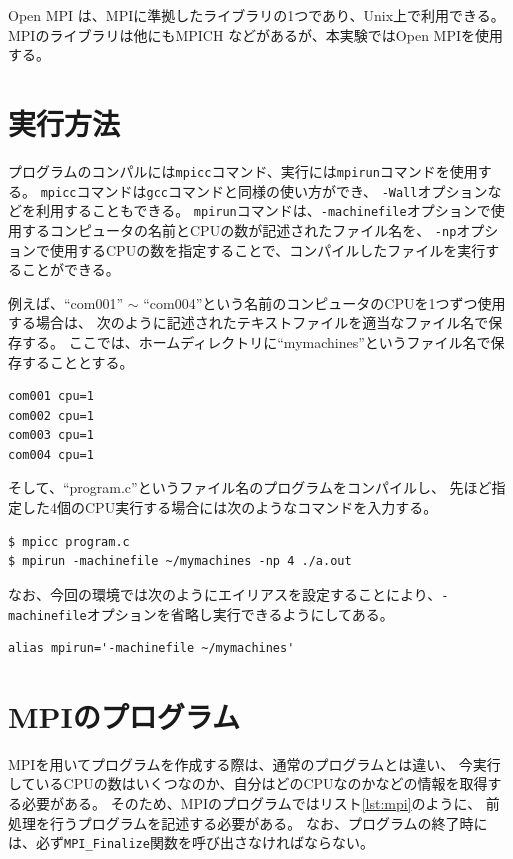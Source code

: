 \documentclass[a4j,titlepage]{jsarticle}
\begin{document}
Open MPI \cite{bib:1} は、MPIに準拠したライブラリの1つであり、Unix上で利用できる。
MPIのライブラリは他にもMPICH \cite{bib:2} などがあるが、本実験ではOpen MPIを使用する。


\section{実行方法}
プログラムのコンパルには\texttt{mpicc}コマンド、実行には\texttt{mpirun}コマンドを使用する。
\texttt{mpicc}コマンドは\texttt{gcc}コマンドと同様の使い方ができ、
\texttt{-Wall}オプションなどを利用することもできる。
\texttt{mpirun}コマンドは、\texttt{-machinefile}オプションで使用するコンピュータの名前とCPUの数が記述されたファイル名を、
\texttt{-np}オプションで使用するCPUの数を指定することで、コンパイルしたファイルを実行することができる。

例えば、``com001'' $\sim$ ``com004''という名前のコンピュータのCPUを1つずつ使用する場合は、
次のように記述されたテキストファイルを適当なファイル名で保存する。
ここでは、ホームディレクトリに``mymachines''というファイル名で保存することとする。

\begin{lstlisting}[style=text]
com001 cpu=1
com002 cpu=1
com003 cpu=1
com004 cpu=1
\end{lstlisting}

そして、``program.c''というファイル名のプログラムをコンパイルし、
先ほど指定した$4$個のCPU実行する場合には次のようなコマンドを入力する。

\begin{lstlisting}[style=text]
$ mpicc program.c
$ mpirun -machinefile ~/mymachines -np 4 ./a.out
\end{lstlisting}

なお、今回の環境では次のようにエイリアスを設定することにより、\texttt{-machinefile}オプションを省略し実行できるようにしてある。

\begin{lstlisting}[style=text]
alias mpirun='-machinefile ~/mymachines'
\end{lstlisting}


\section{MPIのプログラム}
MPIを用いてプログラムを作成する際は、通常のプログラムとは違い、
今実行しているCPUの数はいくつなのか、自分はどのCPUなのかなどの情報を取得する必要がある。
そのため、MPIのプログラムではリスト\ref{lst:mpi}のように、
前処理を行うプログラムを記述する必要がある。
なお、プログラムの終了時には、必ず\texttt{MPI\_Finalize}関数を呼び出さなければならない。
\end{document}
